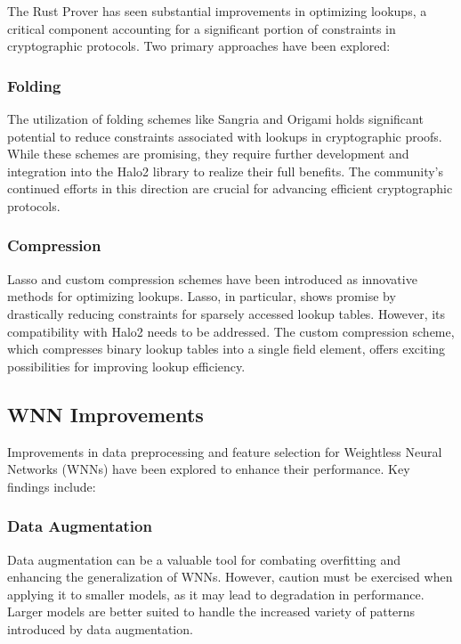 \documentclass{article}[12pt]
\begin{document}
The Rust Prover has seen substantial improvements in optimizing lookups, a critical component accounting for a significant portion of constraints in cryptographic protocols.
Two primary approaches have been explored:

\subsubsection{Folding}\label{subsubsec:prover-folding-conclusion}

The utilization of folding schemes like Sangria and Origami holds significant potential to reduce constraints associated with lookups in cryptographic proofs.
While these schemes are promising, they require further development and integration into the Halo2 library to realize their full benefits.
The community's continued efforts in this direction are crucial for advancing efficient cryptographic protocols.

\subsubsection{Compression}\label{subsubsec:prover-compression-conclusion}

Lasso and custom compression schemes have been introduced as innovative methods for optimizing lookups.
Lasso, in particular, shows promise by drastically reducing constraints for sparsely accessed lookup tables.
However, its compatibility with Halo2 needs to be addressed.
The custom compression scheme, which compresses binary lookup tables into a single field element, offers exciting possibilities for improving lookup efficiency.

\subsection{WNN Improvements}\label{subsec:wnn-conclusion}

Improvements in data preprocessing and feature selection for Weightless Neural Networks (WNNs) have been explored to enhance their performance.
Key findings include:

\subsubsection{Data Augmentation}\label{subsubsec:data-augmentation-conclusion}

Data augmentation can be a valuable tool for combating overfitting and enhancing the generalization of WNNs.
However, caution must be exercised when applying it to smaller models, as it may lead to degradation in performance.
Larger models are better suited to handle the increased variety of patterns introduced by data augmentation.
\end{document}

